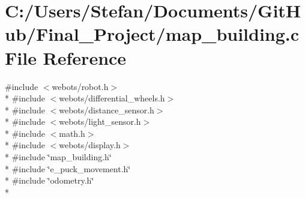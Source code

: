 \section{C\-:/\-Users/\-Stefan/\-Documents/\-Git\-Hub/\-Final\-\_\-\-Project/map\-\_\-building.c File Reference}
\label{map__building_8c}
{\ttfamily \#include $<$webots/robot.\-h$>$}\\*
{\ttfamily \#include $<$webots/differential\-\_\-wheels.\-h$>$}\\*
{\ttfamily \#include $<$webots/distance\-\_\-sensor.\-h$>$}\\*
{\ttfamily \#include $<$webots/light\-\_\-sensor.\-h$>$}\\*
{\ttfamily \#include $<$math.\-h$>$}\\*
{\ttfamily \#include $<$webots/display.\-h$>$}\\*
{\ttfamily \#include \char`\"{}map\-\_\-building.\-h\char`\"{}}\\*
{\ttfamily \#include \char`\"{}e\-\_\-puck\-\_\-movement.\-h\char`\"{}}\\*
{\ttfamily \#include \char`\"{}odometry.\-h\char`\"{}}\\*
